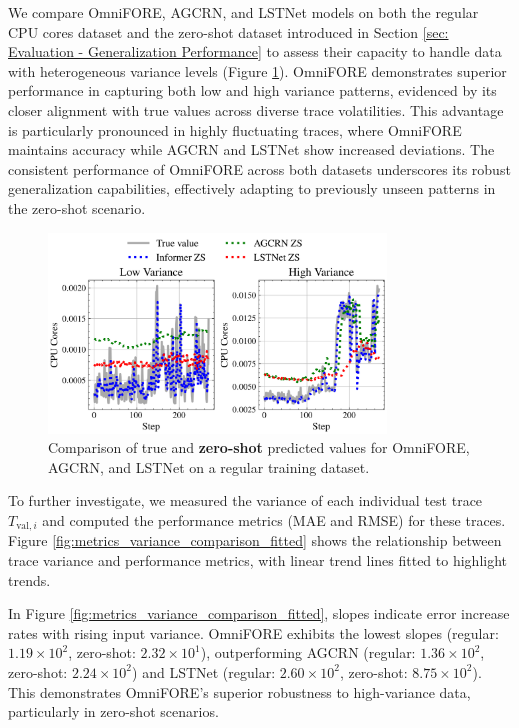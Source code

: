 \documentclass{ieeetmlcn}
\begin{document}
We compare OmniFORE, AGCRN, and LSTNet models on both the regular CPU cores dataset and the zero-shot dataset introduced in Section \ref{sec: Evaluation - Generalization Performance} to assess their capacity to handle data with heterogeneous variance levels (Figure \ref{fig:zs_sample_trace_comparison}). OmniFORE demonstrates superior performance in capturing both low and high variance patterns, evidenced by its closer alignment with true values across diverse trace volatilities. This advantage is particularly pronounced in highly fluctuating traces, where OmniFORE maintains accuracy while AGCRN and LSTNet show increased deviations. The consistent performance of OmniFORE across both datasets underscores its robust generalization capabilities, effectively adapting to previously unseen patterns in the zero-shot scenario. 

\begin{figure}\centering
\centering
\centering\includegraphics[width=0.8\textwidth]{img/zs_sample_trace_comparison.png}
\caption{Comparison of true and \textbf{zero-shot} predicted values for OmniFORE, AGCRN, and LSTNet on a regular training dataset.}
\label{fig:zs_sample_trace_comparison}
\end{figure}

To further investigate, we measured the variance of each individual test trace $T_{\text{val}, i}$ and computed the performance metrics (MAE and RMSE) for these traces. Figure \ref{fig:metrics_variance_comparison_fitted} shows the relationship between trace variance and performance metrics, with linear trend lines fitted to highlight trends.

In Figure \ref{fig:metrics_variance_comparison_fitted}, slopes indicate error increase rates with rising input variance. OmniFORE exhibits the lowest slopes (regular: $1.19 \times 10^2$, zero-shot: $2.32 \times 10^1$), outperforming AGCRN (regular: $1.36 \times 10^2$, zero-shot: $2.24 \times 10^2$) and LSTNet (regular: $2.60 \times 10^2$, zero-shot: $8.75 \times 10^2$). This demonstrates OmniFORE's superior robustness to high-variance data, particularly in zero-shot scenarios.
\end{document}
